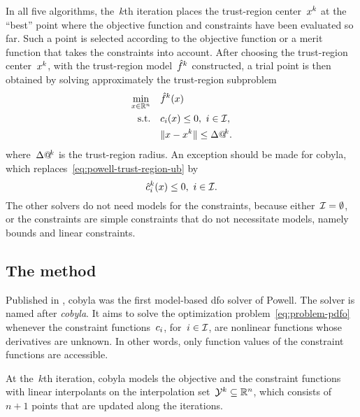 In all five algorithms, the~$k$th iteration places the trust-region center~$\iter[k]$ at the \enquote{best} point where the objective function and constraints have been evaluated so far.
Such a point is selected according to the objective function or a merit function that takes the constraints into account.
After choosing the trust-region center~$\iter[k]$, with the trust-region model~$\objm[k]$ constructed, a trial point is then obtained by solving approximately the trust-region subproblem
\begin{subequations}
    \label{eq:powell-trust-region}
    \begin{align}
        \min_{\iter \in \R^n}   & \quad \objm[k](\iter)\\
        \text{s.t.}             & \quad \con{i}(\iter) \le 0, ~ i \in \iub, \label{eq:powell-trust-region-ub}\\
                                & \quad \norm{\iter - \iter[k]} \le \rad[k].
    \end{align}
\end{subequations}
where~$\rad[k]$ is the trust-region radius.
An exception should be made for \gls{cobyla}, which replaces~\cref{eq:powell-trust-region-ub} by
\begin{equation*}
    \conm[k]{i}(\iter) \le 0, ~ i \in \iub.
\end{equation*}
The other solvers do not need models for the constraints, because either~$\mathcal{I} = \emptyset$, or the constraints are simple constraints that do not necessitate models, namely bounds and linear constraints.

\subsection{The  method}
\label{subsec:cobyla}

Published in , \gls{cobyla} was the first model-based \gls{dfo} solver of Powell.
The solver is named after \emph{\glsdesc{cobyla}}.
It aims to solve the optimization problem~\cref{eq:problem-pdfo} whenever the constraint functions~$c_{i}$, for~$i \in \mathcal{I}$, are nonlinear functions whose derivatives are unknown.
In other words, only function values of the constraint functions are accessible.

At the~$k$th iteration, \gls{cobyla} models the objective and the constraint functions with linear interpolants on the interpolation set~$\xpt[k] \subseteq \R^n$, which consists of~$n + 1$ points that are updated along the iterations.

